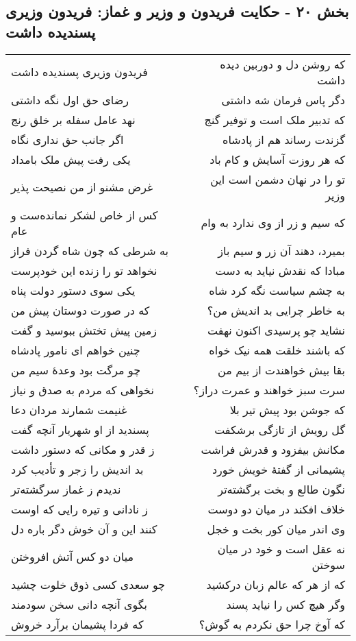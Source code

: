 \begin{center}
\section*{بخش ۲۰ - حکایت فریدون و وزیر و غماز: فریدون وزیری پسندیده داشت}
\label{sec:020}
\begin{longtable}{l p{0.5cm} r}
فریدون وزیری پسندیده داشت
&&
که روشن دل و دوربین دیده داشت
\\
رضای حق اول نگه داشتی
&&
دگر پاس فرمان شه داشتی
\\
نهد عامل سفله بر خلق رنج
&&
که تدبیر ملک است و توفیر گنج
\\
اگر جانب حق نداری نگاه
&&
گزندت رساند هم از پادشاه
\\
یکی رفت پیش ملک بامداد
&&
که هر روزت آسایش و کام باد
\\
غرض مشنو از من نصیحت پذیر
&&
تو را در نهان دشمن است این وزیر
\\
کس از خاص لشکر نمانده‌ست و عام
&&
که سیم و زر از وی ندارد به وام
\\
به شرطی که چون شاه گردن فراز
&&
بمیرد، دهند آن زر و سیم باز
\\
نخواهد تو را زنده این خودپرست
&&
مبادا که نقدش نیاید به دست
\\
یکی سوی دستور دولت پناه
&&
به چشم سیاست نگه کرد شاه
\\
که در صورت دوستان پیش من
&&
به خاطر چرایی بد اندیش من؟
\\
زمین پیش تختش ببوسید و گفت
&&
نشاید چو پرسیدی اکنون نهفت
\\
چنین خواهم ای نامور پادشاه
&&
که باشند خلقت همه نیک خواه
\\
چو مرگت بود وعدهٔ سیم من
&&
بقا بیش خواهندت از بیم من
\\
نخواهی که مردم به صدق و نیاز
&&
سرت سبز خواهند و عمرت دراز؟
\\
غنیمت شمارند مردان دعا
&&
که جوشن بود پیش تیر بلا
\\
پسندید از او شهریار آنچه گفت
&&
گل رویش از تازگی برشکفت
\\
ز قدر و مکانی که دستور داشت
&&
مکانش بیفزود و قدرش فراشت
\\
بد اندیش را زجر و تأدیب کرد
&&
پشیمانی از گفتهٔ خویش خورد
\\
ندیدم ز غماز سرگشته‌تر
&&
نگون طالع و بخت برگشته‌تر
\\
ز نادانی و تیره رایی که اوست
&&
خلاف افکند در میان دو دوست
\\
کنند این و آن خوش دگر باره دل
&&
وی اندر میان کور بخت و خجل
\\
میان دو کس آتش افروختن
&&
نه عقل است و خود در میان سوختن
\\
چو سعدی کسی ذوق خلوت چشید
&&
که از هر که عالم زبان درکشید
\\
بگوی آنچه دانی سخن سودمند
&&
وگر هیچ کس را نیاید پسند
\\
که فردا پشیمان برآرد خروش
&&
که آوخ چرا حق نکردم به گوش؟
\\
\end{longtable}
\end{center}
